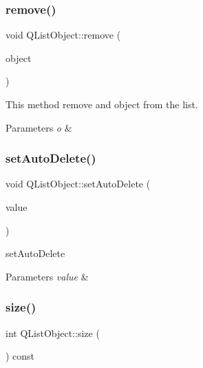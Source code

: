 \subsubsection{\texorpdfstring{remove()}{remove()}}
{\footnotesize\ttfamily void Q\+List\+Object\+::remove (\begin{DoxyParamCaption}\item[{Q\+Object $\ast$}]{object }\end{DoxyParamCaption})}



This method remove and object from the list. 


\begin{DoxyParams}{Parameters}
{\em o} & \\
\hline
\end{DoxyParams}
\mbox{\label{class_q_list_object_a6c30632fb46f8f7d404f77a9fea49bee}} 
\subsubsection{\texorpdfstring{set\+Auto\+Delete()}{setAutoDelete()}}
{\footnotesize\ttfamily void Q\+List\+Object\+::set\+Auto\+Delete (\begin{DoxyParamCaption}\item[{bool}]{value }\end{DoxyParamCaption})}



set\+Auto\+Delete 


\begin{DoxyParams}{Parameters}
{\em value} & \\
\hline
\end{DoxyParams}
\mbox{\label{class_q_list_object_a4ded55097ea08fa5781240883a591216}} 
\subsubsection{\texorpdfstring{size()}{size()}}
{\footnotesize\ttfamily int Q\+List\+Object\+::size (\begin{DoxyParamCaption}{ }\end{DoxyParamCaption}) const}



